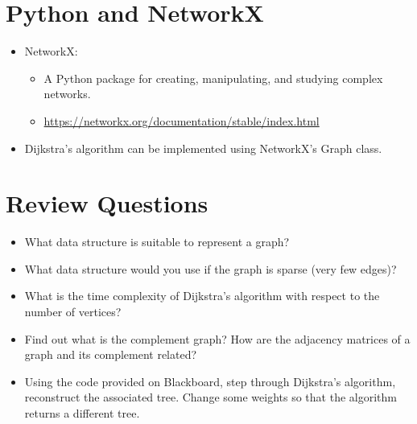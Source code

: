 \documentclass{article}
\begin{document}
\section*{Python and NetworkX}
\begin{itemize}
    \item NetworkX:
    \begin{itemize}
        \item A Python package for creating, manipulating, and studying complex networks.
        \item \url{https://networkx.org/documentation/stable/index.html}
    \end{itemize}
    \item Dijkstra's algorithm can be implemented using NetworkX's Graph class.
\end{itemize}

\section*{Review Questions}
\begin{itemize}
    \item What data structure is suitable to represent a graph?
    \item What data structure would you use if the graph is sparse (very few edges)?
    \item What is the time complexity of Dijkstra's algorithm with respect to the number of vertices?
    \item Find out what is the complement graph? How are the adjacency matrices of a graph and its complement related?
    \item Using the code provided on Blackboard, step through Dijkstra's algorithm, reconstruct the associated tree. Change some weights so that the algorithm returns a different tree.
\end{itemize}
\end{document}
